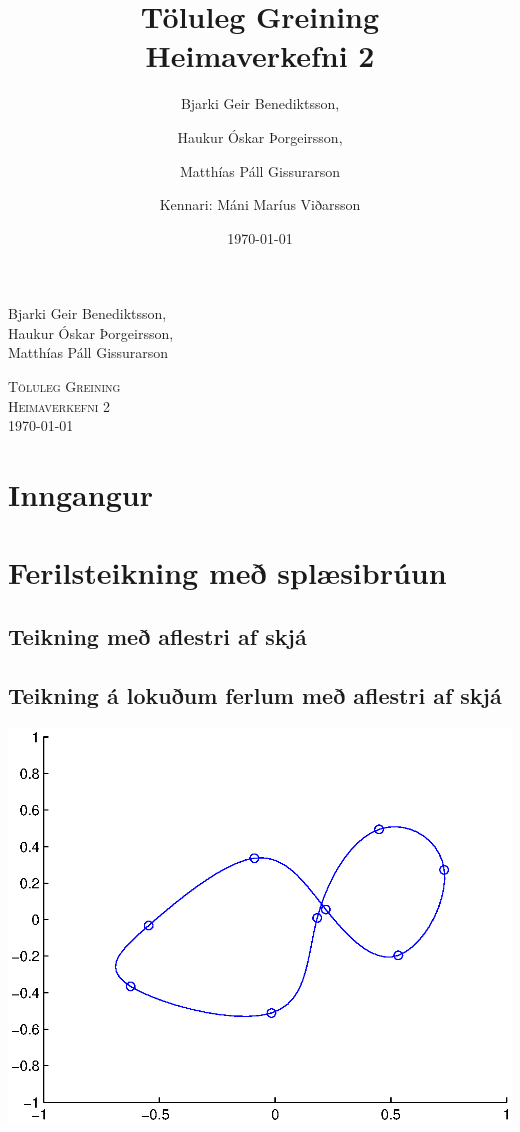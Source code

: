 \documentclass[a4]{article}
\title{Töluleg Greining\\ Heimaverkefni 2}
\date{\today{}}
\author{ 
  Bjarki Geir Benediktsson,\and
  Haukur Óskar Þorgeirsson,\and
  Matthías Páll Gissurarson \and
  Kennari: Máni Maríus Viðarsson
  }
\begin{document}
\begin{flushright}
  Bjarki Geir Benediktsson,\\
  Haukur Óskar Þorgeirsson,\\
  Matthías Páll Gissurarson\\
\end{flushright}

\begin{center}
 \textsc{ \LARGE Töluleg Greining\\
  Heimaverkefni 2\\
  \today{}
  }
  \end{center}
\vfill

\maketitle
\section*{Inngangur}
\section{Ferilsteikning með splæsibrúun}
\subsection{Teikning með aflestri af skjá}

\subsection{Teikning á lokuðum ferlum með aflestri af skjá}
\includegraphics[height=0.495\textheight]{Ss1.eps}\\
\end{document}
